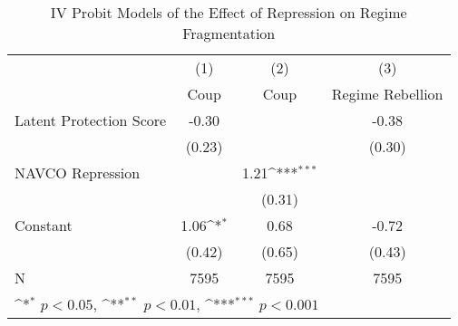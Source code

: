 \begin{table}[htbp]\centering
\def\sym#1{\ifmmode^{#1}\else\(^{#1}\)\fi}
\caption{\label{tab4} IV Probit Models of the Effect of Repression on Regime Fragmentation}
\begin{tabular}{l*{3}{c}}
\hline\hline
                    &\multicolumn{1}{c}{(1)}         &\multicolumn{1}{c}{(2)}         &\multicolumn{1}{c}{(3)}         \\
                    &        Coup         &        Coup         &Regime Rebellion         \\
\hline
Latent Protection Score&       -0.30         &                     &       -0.38         \\
                    &      (0.23)         &                     &      (0.30)         \\
NAVCO Repression    &                     &        1.21\sym{***}&                     \\
                    &                     &      (0.31)         &                     \\
Constant            &        1.06\sym{*}  &        0.68         &       -0.72         \\
                    &      (0.42)         &      (0.65)         &      (0.43)         \\
\hline
N                   &        7595         &        7595         &        7595         \\
\hline\hline
\multicolumn{4}{l}{\footnotesize \sym{*} \(p<0.05\), \sym{**} \(p<0.01\), \sym{***} \(p<0.001\)}\\
\end{tabular}
\end{table}
